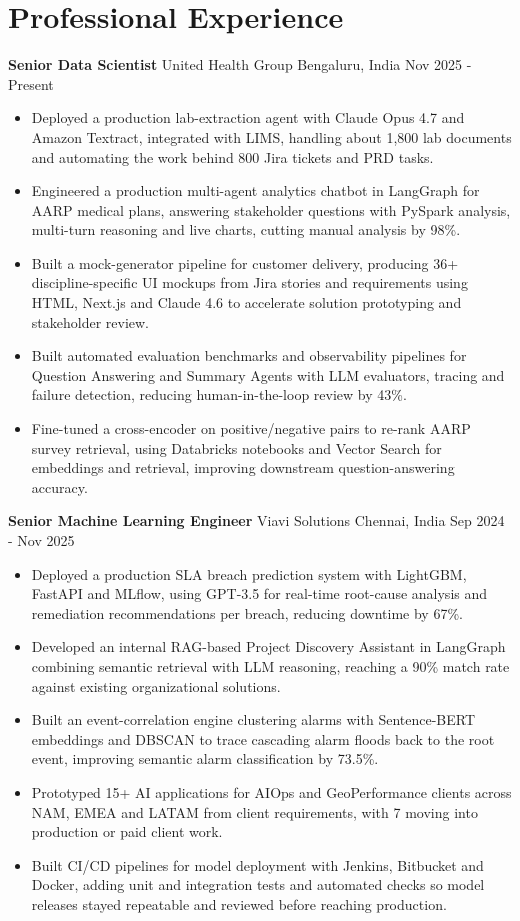 \documentclass[10pt,a4paper]{article}
\newcommand{\role}[4]{\textbf{#1} \textbar{} #2 \hfill #3 \textbar{} #4\par}
\begin{document}
\section{Professional Experience}
\role{Senior Data Scientist}{United Health Group}{Bengaluru, India}{Nov 2025 - Present}
\begin{itemize}
  \item Deployed a production lab-extraction agent with Claude Opus 4.7 and Amazon Textract, integrated with LIMS, handling about 1,800 lab documents and automating the work behind 800 Jira tickets and PRD tasks.
  \item Engineered a production multi-agent analytics chatbot in LangGraph for AARP medical plans, answering stakeholder questions with PySpark analysis, multi-turn reasoning and live charts, cutting manual analysis by 98\%.
  \item Built a mock-generator pipeline for customer delivery, producing 36+ discipline-specific UI mockups from Jira stories and requirements using HTML, Next.js and Claude 4.6 to accelerate solution prototyping and stakeholder review.
  \item Built automated evaluation benchmarks and observability pipelines for Question Answering and Summary Agents with LLM evaluators, tracing and failure detection, reducing human-in-the-loop review by 43\%.
  \item Fine-tuned a cross-encoder on positive/negative pairs to re-rank AARP survey retrieval, using Databricks notebooks and Vector Search for embeddings and retrieval, improving downstream question-answering accuracy.
\end{itemize}
\vspace{3pt}
\role{Senior Machine Learning Engineer}{Viavi Solutions}{Chennai, India}{Sep 2024 - Nov 2025}
\begin{itemize}
  \item Deployed a production SLA breach prediction system with LightGBM, FastAPI and MLflow, using GPT-3.5 for real-time root-cause analysis and remediation recommendations per breach, reducing downtime by 67\%.
  \item Developed an internal RAG-based Project Discovery Assistant in LangGraph combining semantic retrieval with LLM reasoning, reaching a 90\% match rate against existing organizational solutions.
  \item Built an event-correlation engine clustering alarms with Sentence-BERT embeddings and DBSCAN to trace cascading alarm floods back to the root event, improving semantic alarm classification by 73.5\%.
  \item Prototyped 15+ AI applications for AIOps and GeoPerformance clients across NAM, EMEA and LATAM from client requirements, with 7 moving into production or paid client work.
  \item Built CI/CD pipelines for model deployment with Jenkins, Bitbucket and Docker, adding unit and integration tests and automated checks so model releases stayed repeatable and reviewed before reaching production.
\end{itemize}
\end{document}
